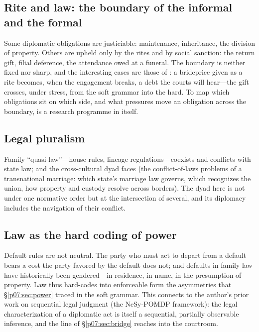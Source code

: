 \documentclass[11pt,a4paper]{article}
\newcommand{\emb}[1]{\textcolor{rose}{\oldtextbf{#1}}}
\newcommand{\xref}[1]{\textcolor{rose}{\S\ref{#1}}}
\begin{document}
\subsection{Rite and law: the boundary of the informal and the formal}
Some diplomatic obligations are justiciable: maintenance, inheritance, the division of property. Others are upheld only by the rites and by social sanction: the return gift, filial deference, the attendance owed at a funeral. The boundary is neither fixed nor sharp, and the interesting cases are those of \emb{conversion}: a brideprice given as a rite becomes, when the engagement breaks, a debt the courts will hear---the gift crosses, under stress, from the soft grammar into the hard. To map which obligations sit on which side, and what pressures move an obligation across the boundary, is a research programme in itself.

\subsection{Legal pluralism}
Family ``quasi-law''---house rules, lineage regulations---coexists and conflicts with state law; and the cross-cultural dyad faces \emb{two jurisdictions at once} (the conflict-of-laws problems of a transnational marriage: which state's marriage law governs, which recognizes the union, how property and custody resolve across borders). The dyad here is not under one normative order but at the intersection of several, and its diplomacy includes the navigation of their conflict.

\subsection{Law as the hard coding of power}
Default rules are not neutral. The party who must act to depart from a default bears a cost the party favored by the default does not; and defaults in family law have historically been gendered---in residence, in name, in the presumption of property. Law thus hard-codes into enforceable form the asymmetries that \xref{p07:sec:power} traced in the soft grammar. This connects to the author's prior work on sequential legal judgment (the NeSy-POMDP framework): the legal characterization of a diplomatic act is itself a sequential, partially observable inference, and the line of \xref{p07:sec:bridge} reaches into the courtroom.
\end{document}
